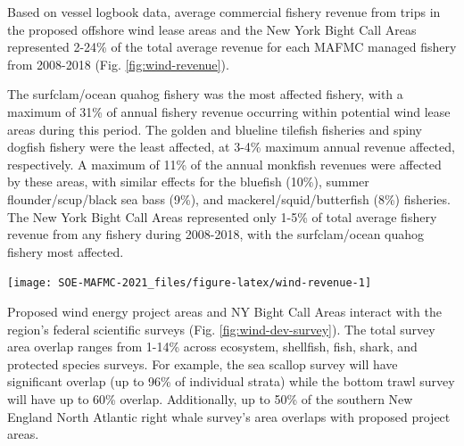 \documentclass[
  10pt,
]{article}
\let\origfigure\figure
\let\endorigfigure\endfigure
\renewenvironment{figure}[1][2] {
    \expandafter\origfigure\expandafter[H]
} {
    \endorigfigure
}
\begin{document}
Based on vessel logbook data, average commercial fishery revenue from
trips in the proposed offshore wind lease areas and the New York Bight
Call Areas represented 2-24\% of the total average revenue for each
MAFMC managed fishery from 2008-2018 (Fig. \ref{fig:wind-revenue}).

The surfclam/ocean quahog fishery was the most affected fishery, with a
maximum of 31\% of annual fishery revenue occurring within potential
wind lease areas during this period. The golden and blueline tilefish
fisheries and spiny dogfish fishery were the least affected, at 3-4\%
maximum annual revenue affected, respectively. A maximum of 11\% of the
annual monkfish revenues were affected by these areas, with similar
effects for the bluefish (10\%), summer flounder/scup/black sea bass
(9\%), and mackerel/squid/butterfish (8\%) fisheries. The New York Bight
Call Areas represented only 1-5\% of total average fishery revenue from
any fishery during 2008-2018, with the surfclam/ocean quahog fishery
most affected.

\begin{figure}

{\centering \texttt{[image: SOE-MAFMC-2021\_files/figure-latex/wind-revenue-1]} 

}

\caption{Wind energy revenue in the Mid-Atlantic}\label{fig:wind-revenue}
\end{figure}

Proposed wind energy project areas and NY Bight Call Areas interact with
the region's federal scientific surveys (Fig.
\ref{fig:wind-dev-survey}). The total survey area overlap ranges from
1-14\% across ecosystem, shellfish, fish, shark, and protected species
surveys. For example, the sea scallop survey will have significant
overlap (up to 96\% of individual strata) while the bottom trawl survey
will have up to 60\% overlap. Additionally, up to 50\% of the southern
New England North Atlantic right whale survey's area overlaps with
proposed project areas.
\end{document}
